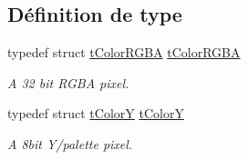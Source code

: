 \subsection*{Définition de type}
\begin{DoxyCompactItemize}
\item 
typedef struct \hyperlink{a00015}{tColorRGBA} \hyperlink{a00044_ac91ff95383d3a6c0df046a42e23baf04}{tColorRGBA}
\begin{DoxyCompactList}\small\item\em A 32 bit RGBA pixel. \end{DoxyCompactList}\item 
typedef struct \hyperlink{a00016}{tColorY} \hyperlink{a00044_a9db27e25d1a6e93c64eb768007dcf3da}{tColorY}
\begin{DoxyCompactList}\small\item\em A 8bit Y/palette pixel. \end{DoxyCompactList}\end{DoxyCompactItemize}
